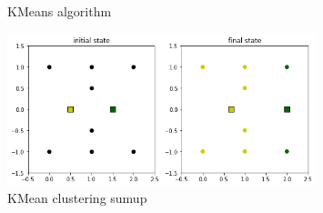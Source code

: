 \documentclass{homework}
\begin{document}
\begin{itemize}
\begin{figure}
		\caption{KMeans algorithm}
	\end{figure}
	\hfill
	\begin{figure}
		\centering
		\includegraphics[width=0.8\textwidth]{kmeans_exercise_3_sumup.png}
		\caption{KMean clustering sumup}
	\end{figure}
\end{itemize}
\end{document}
